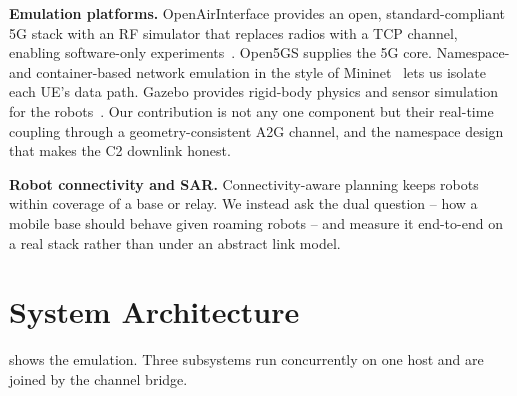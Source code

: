 \documentclass[conference]{IEEEtran}
\begin{document}
\textbf{Emulation platforms.} OpenAirInterface provides an open, standard-compliant
5G stack with an RF simulator that replaces radios with a TCP channel, enabling
software-only experiments~\cite{nikaein2014oai}. Open5GS supplies the 5G core.
Namespace- and container-based network emulation in the style of
Mininet~\cite{lantz2010mininet} lets us isolate each UE's data path. Gazebo
provides rigid-body physics and sensor simulation for the
robots~\cite{koenig2004gazebo}. Our contribution is not any one component but
their real-time coupling through a geometry-consistent A2G channel, and the
namespace design that makes the C2 downlink honest.

\textbf{Robot connectivity and SAR.} Connectivity-aware planning keeps robots
within coverage of a base or relay. We instead ask the dual question -- how a
mobile base should behave given roaming robots -- and measure it end-to-end on a
real stack rather than under an abstract link model.

\section{System Architecture}
\label{sec:system}
 shows the emulation. Three subsystems run concurrently on one
host and are joined by the channel bridge.
\end{document}
